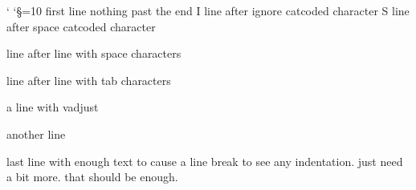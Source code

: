 \documentclass{article}
\begin{document}
\catcode`
\catcode`\S=10
first line^^M nothing past the end
I
line after ignore catcoded character
S
line after space catcoded character
  
line after line with space characters
		
line after line with tab characters

a line with vadjust

another line

last line with enough text to cause a line break to see any indentation. just need a bit more. that should be enough.
\end{document}
